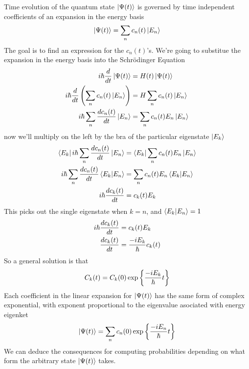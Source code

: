 \documentclass[english, 11pt]{article}
\begin{document}
    Time evolution of the quantum state $\left|\Psi(t)\right\rangle$ is governed by time independent coefficients of an expansion in the energy basis
    \[ \left|\Psi(t)\right\rangle = \sum_n c_n(t)\left|E_n\right\rangle \]
    The goal is to find an expression for the $c_n(t)$'s. We're going to substitue the expansion in the energy basis into the Schrödinger Equation
    \begin{align*}
      i\hbar\frac{d}{dt} \left|\Psi(t)\right\rangle & = H(t)\left|\Psi(t)\right\rangle \\
      i\hbar\frac{d}{dt} \left( \sum_n c_n(t) \left|E_n\right\rangle \right) & = H\sum_n c_n(t)\left|E_n\right\rangle \\
      i\hbar \sum_n \frac{dc_n(t)}{dt} \left|E_n\right\rangle & = \sum_n c_n(t) E_n \left|E_n\right\rangle \\
    \end{align*}
    now we'll multiply on the left by the bra of the particular eigenstate $\left|E_k\right\rangle$
    \begin{align*}
      \bra{E_k} i\hbar \sum_n \f{dc_n(t)}{dt} \ket{E_n} & = \bra{E_k} \sum_n c_n(t) E_n \ket{E_n} \\
      i\hbar \sum_n \f{dc_n(t)}{dt}\braket{E_k}{E_n} & = \sum_n c_n(t)E_n\braket{E_k}{E_n} \\
      i\hbar \f{dc_k(t)}{dt} & = c_k(t)E_k
    \end{align*}
    This picks out the single eigenstate when $k=n$, and $\braket{E_k}{E_n} =1$
    \begin{align*}
      i\hbar \frac{dc_k(t)}{dt} & = c_k(t)E_k \\
      \frac{dc_k(t)}{dt} & = \frac{-iE_k}{\hbar} c_k(t)
    \end{align*}
    So a general solution is that
    \[ C_k(t) = C_k(0) \exp \left\{ \frac{-iE_k}{\hbar} t \right\} \]
    Each coefficient in the linear expansion for $\left|\Psi(t)\right\rangle$ has the same form of complex exponential, with exponent proportional to the eigenvalue asociated with energy eigenket
    \[ \left|\Psi(t)\right\rangle = \sum_n c_n(0)\exp\left\{\frac{-iE_n}{\hbar} t\right\} \]
    We can deduce the consequences for computing probabilities depending on what form the arbitrary state $\left|\Psi(t)\right\rangle$ takes.
\end{document}
